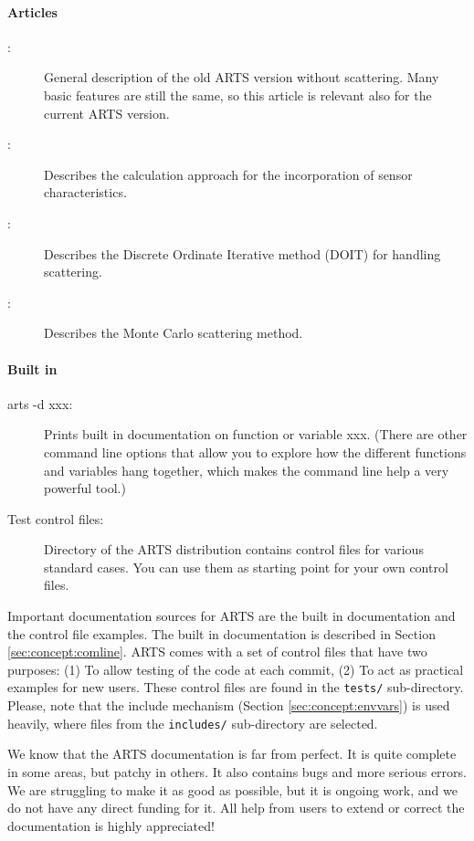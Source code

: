 \paragraph{Articles}
\begin{description}
\item[\citet{buehler:artst:05}:] General description of the old ARTS
  version without scattering. Many basic features are still the same,
  so this article is relevant also for the current ARTS version.
\item[\citet{eriksson:06}:] Describes the calculation approach for the
  incorporation of sensor characteristics.
\item[\citet{emde04:_doit_jgr}:] Describes the Discrete Ordinate Iterative method (DOIT) for handling scattering.
\item[\citet{davisetal:04}:] Describes the Monte Carlo scattering method.
\end{description}

\paragraph{Built in}
\begin{description}
\item[arts -d xxx:] Prints built in documentation on function or
  variable xxx. (There are other command line options that allow you
  to explore how the different functions and variables hang together,
  which makes the command line help a very powerful tool.)
\item[Test control files:] Directory  of the ARTS distribution
  contains control files for various standard cases. You can use them
  as starting point for your own control files. 
\end{description}

Important documentation sources for ARTS are the built in documentation
and the control file examples. The built in documentation is described in
Section \ref{sec:concept:comline}. ARTS comes with a set of control
files that have two purposes: (1) To allow testing of the code at each
commit, (2) To act as practical examples for new users. These control
files are found in the \verb|tests/| sub-directory. Please, note that the
include mechanism (Section \ref{sec:concept:envvars}) is used heavily,
where files from the \verb|includes/| sub-directory are selected.

We know that the ARTS documentation is far from perfect. It is quite
complete in some areas, but patchy in others. It also contains bugs
and more serious errors. We are struggling to make it as good as
possible, but it is ongoing work, and we do not have any direct
funding for it. All help from users to extend or correct the
documentation is highly appreciated!


